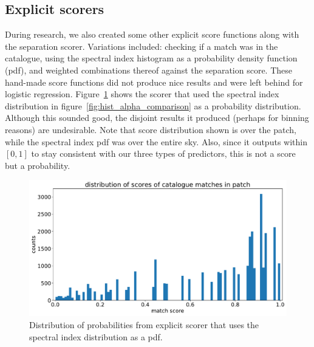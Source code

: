 \documentclass[12pt,a4paper]{article}
\begin{document}
\subsection{Explicit scorers}
\label{app:scorers}
During research, we also created some other explicit score functions along with the separation scorer. Variations included: checking if a match was in the catalogue, using the spectral index histogram as a probability density function (pdf), and weighted combinations thereof against the separation score. These hand-made score functions did not produce nice results and were left behind for logistic regression. Figure~\ref{fig:spectral_scorer} shows the scorer that used the spectral index distribution in figure~\ref{fig:hist_alpha_comparison} as a probability distribution. Although this sounded good, the disjoint results it produced (perhaps for binning reasons) are undesirable. Note that score distribution shown is over the patch, while the spectral index pdf was over the entire sky. Also, since it outputs within $[0,1]$ to stay consistent with our three types of predictors, this is not a score but a probability.
\begin{figure}[H]
    \centering
    \includegraphics[width=\textwidth]{pics/hist_patch_cat_score_spectral.pdf}
    \caption{Distribution of probabilities from explicit scorer that uses the spectral index distribution as a pdf.}
    \label{fig:spectral_scorer}
\end{figure}
\end{document}
